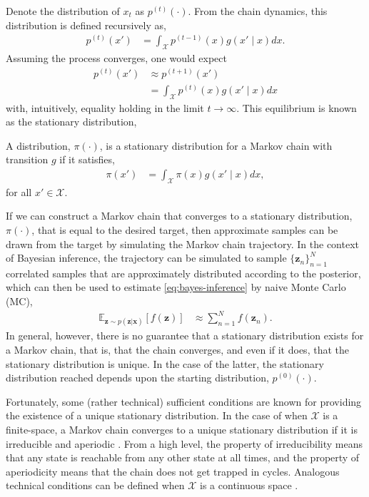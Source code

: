 Denote the distribution of $x_t$ as $p^{(t)}(\cdot)$. From the chain dynamics, this distribution is defined recursively as,
\begin{align*}
	p^{(t)}(x') &= \int_\mathcal{X}p^{(t-1)}(x)g(x'\mid x)dx.
\end{align*}
Assuming the process converges, one would expect
\begin{align*}
	p^{(t)}(x') &\approx p^{(t+1)}(x')\\
	&= \int_\mathcal{X}p^{(t)}(x)g(x'\mid x)dx
\end{align*}
with, intuitively, equality holding in the limit $t\rightarrow\infty$. This equilibrium is known as the stationary distribution,
\begin{definition}
	A distribution, $\pi(\cdot)$, is a stationary distribution for a Markov chain with transition $g$ if it satisfies,
	\begin{align*}
		\pi(x')	&= \int_\mathcal{X}\pi(x)g(x'\mid x)dx,
	\end{align*}
	for all $x'\in\mathcal{X}$.
\end{definition}
If we can construct a Markov chain that converges to a stationary distribution, $\pi(\cdot)$, that is equal to the desired target, then approximate samples can be drawn from the target by simulating the Markov chain trajectory. In the context of Bayesian inference, the trajectory can be simulated to sample $\{\mathbf{z}_n\}_{n=1}^N$ correlated samples that are approximately distributed according to the posterior, which can then be used to estimate \eqref{eq:bayes-inference} by naive Monte Carlo (MC),
\begin{align*}
	\mathbb{E}_{\mathbf{z}\sim p(\mathbf{z}|\mathbf{x})}\left[f(\mathbf{z})\right] &\approx \sum^N_{n=1}f(\mathbf{z}_n).
\end{align*}
In general, however, there is no guarantee that a stationary distribution exists for a Markov chain, that is, that the chain converges, and even if it does, that the stationary distribution is unique. In the case of the latter, the stationary distribution reached depends upon the starting distribution, $p^{(0)}(\cdot)$.

Fortunately, some (rather technical) sufficient conditions are known for providing the existence of a unique stationary distribution. In the case of when $\mathcal{X}$ is a finite-space, a Markov chain converges to a unique stationary distribution if it is irreducible and aperiodic \citep{andrieu2003introduction}. From a high level, the property of irreducibility means that any state is reachable from any other state at all times, and the property of aperiodicity means that the chain does not get trapped in cycles. Analogous technical conditions can be defined when $\mathcal{X}$ is a continuous space \citep[Theorem 8.2.14]{stachurski2009economic}.

